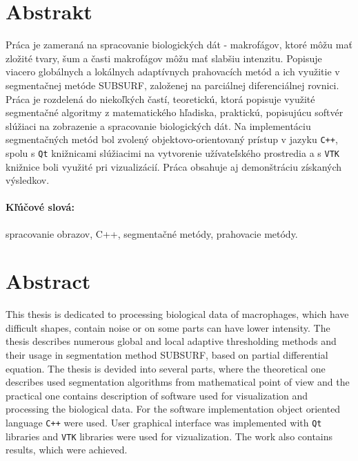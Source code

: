 \documentclass[a4paper,11pt,oneside]{article}%
\begin{document}
\newpage 
 \thispagestyle{empty}
\section*{Abstrakt}

Práca je zameraná na spracovanie biologických dát - makrofágov, ktoré môžu mať zložité tvary, šum a časti makrofágov môžu mať slabšiu intenzitu. Popisuje viacero globálnych a lokálnych adaptívnych prahovacích metód a ich využitie v segmentačnej metóde SUBSURF, založenej na parciálnej diferenciálnej rovnici. Práca je rozdelená do niekoľkých častí, teoretickú, ktorá popisuje využité segmentačné algoritmy z matematického hľadiska, praktickú, popisujúcu softvér slúžiaci na zobrazenie a spracovanie biologických dát. Na implementáciu segmentačných metód bol zvolený objektovo-orientovaný prístup v jazyku \texttt{C++}, spolu s \texttt{Qt} knižnicami slúžiacimi na vytvorenie užívateľského prostredia a s \texttt{VTK} knižnice boli využité pri vizualizácií. Práca obsahuje aj demonštráciu získaných výsledkov.


\paragraph*{Kľúčové slová:}spracovanie obrazov, C++, segmentačné metódy, prahovacie metódy.

\section*{Abstract}

This thesis is dedicated to processing biological data of macrophages, which have difficult shapes, contain noise or on some parts can have lower intensity. The thesis describes numerous global and local adaptive thresholding methods and their usage in segmentation method SUBSURF, based on partial differential equation. The thesis is devided into several parts, where the theoretical one describes  used segmentation algorithms from mathematical point of view and the practical one contains description of software used for visualization and processing the biological data. For the software implementation object oriented language \texttt{C++} were used. User graphical interface was implemented with \texttt{Qt} libraries and \texttt{VTK} libraries were used for vizualization. The work also contains results, which were achieved.
\end{document}
